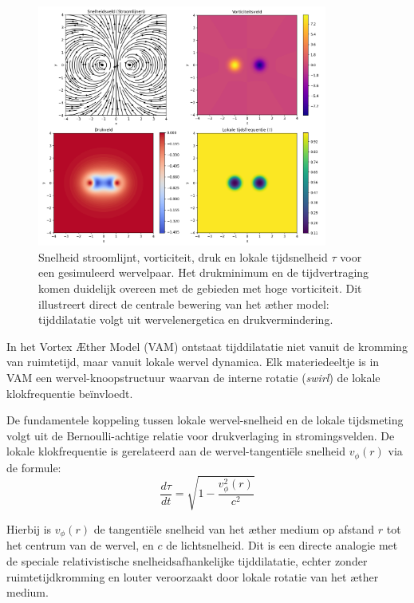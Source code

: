 \begin{figure}[htbp]
\centering
\includegraphics[width=0.85\textwidth]{01-streamlinesDiPole_nl}
\caption{Snelheid stroomlijnt, vorticiteit, druk en lokale tijdsnelheid $\tau$ voor een gesimuleerd wervelpaar. Het drukminimum en de tijdvertraging komen duidelijk overeen met de gebieden met hoge vorticiteit. Dit illustreert direct de centrale bewering van het æther model: tijddilatatie volgt uit wervelenergetica en drukvermindering.}
\label{fig:vortexfields}
\end{figure}

In het Vortex Æther Model (VAM) ontstaat tijddilatatie niet vanuit de kromming van ruimtetijd, maar vanuit lokale wervel dynamica. Elk materiedeeltje is in VAM een wervel-knoopstructuur waarvan de interne rotatie (\textit{swirl}) de lokale klokfrequentie beïnvloedt.

De fundamentele koppeling tussen lokale wervel-snelheid en de lokale tijdsmeting volgt uit de Bernoulli-achtige relatie voor drukverlaging in stromingsvelden. De lokale klokfrequentie is gerelateerd aan de wervel-tangentiële snelheid $v_{\phi}(r)$ via de formule:
\begin{equation}\label{eq:vortex_tijddilatatie}
    \frac{d\tau}{dt} = \sqrt{1 - \frac{v_{\phi}^2(r)}{c^2}}
\end{equation}

Hierbij is $v_{\phi}(r)$ de tangentiële snelheid van het æther medium op afstand $r$ tot het centrum van de wervel, en $c$ de lichtsnelheid. Dit is een directe analogie met de speciale relativistische snelheidsafhankelijke tijddilatatie, echter zonder ruimtetijdkromming en louter veroorzaakt door lokale rotatie van het æther medium.

